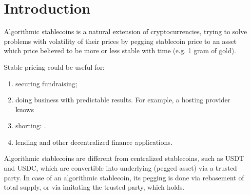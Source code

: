 
\section{Introduction}

Algorithmic stablecoins is a natural extension of cryptocurrencies, trying to 
solve problems with volatility of their prices by pegging stablecoin price to an
asset which price believed to be more or less stable with time (e.g. 1 gram of gold).  


Stable pricing could be useful for:
\begin{enumerate}
\item securing fundraising;
\item doing business with predictable results. For example, a hosting provider knows 
\item shorting: .
\item lending and other decentralized finance applications. 
\end{enumerate}

Algorithmic stablecoins are different from centralized stablecoins, such as USDT and USDC, which are 
convertible into underlying (pegged asset) via a trusted party. In case of an algorithmic stablecoin, its 
pegging is done via rebasement of total supply, or via imitating the trusted party, which holds. 

